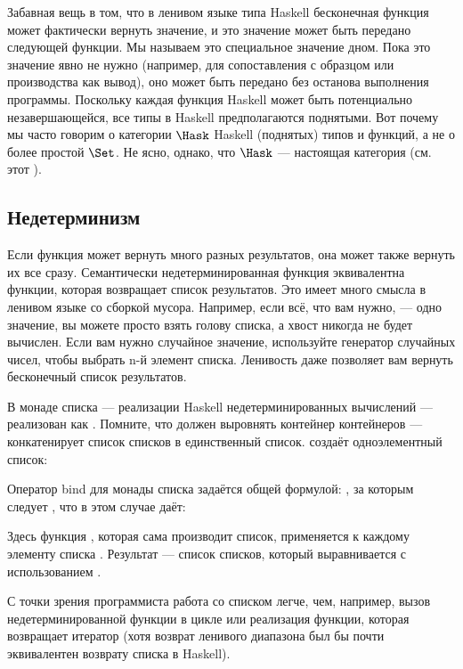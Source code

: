Забавная вещь в том, что в ленивом языке типа Haskell бесконечная
функция может фактически вернуть значение, и это значение может быть передано
следующей функции. Мы называем это специальное значение дном. Пока
это значение явно не нужно (например, для сопоставления с образцом
или производства как вывод), оно может быть передано без
останова выполнения программы. Поскольку каждая функция Haskell
может быть потенциально незавершающейся, все типы в Haskell предполагаются
поднятыми. Вот почему мы часто говорим о категории $\Hask$
Haskell (поднятых) типов и функций, а не о более простой
$\Set$. Не ясно, однако, что $\Hask$ --- настоящая
категория (см. этот
).

\subsection{Недетерминизм}

Если функция может вернуть много разных результатов, она может также вернуть
их все сразу. Семантически недетерминированная функция
эквивалентна функции, которая возвращает список результатов. Это имеет много
смысла в ленивом языке со сборкой мусора. Например, если всё,
что вам нужно, --- одно значение, вы можете просто взять голову списка, а
хвост никогда не будет вычислен. Если вам нужно случайное значение, используйте генератор
случайных чисел, чтобы выбрать n-й элемент списка. Ленивость даже
позволяет вам вернуть бесконечный список результатов.

В монаде списка --- реализации Haskell недетерминированных
вычислений ---  реализован как .
Помните, что  должен выровнять контейнер
контейнеров ---  конкатенирует список списков в
единственный список.  создаёт одноэлементный список:

Оператор bind для монады списка задаётся общей формулой:
, за которым следует , что в этом случае даёт:

Здесь функция , которая сама производит список, применяется
к каждому элементу списка . Результат --- список списков,
который выравнивается с использованием .

С точки зрения программиста работа со списком легче, чем, например,
вызов недетерминированной функции в цикле или
реализация функции, которая возвращает итератор (хотя
 возврат ленивого диапазона был бы почти эквивалентен возврату
списка в Haskell).

